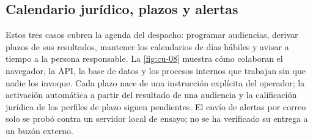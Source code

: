 
\newcommand{\CUcFicha}[2][7]{\par\medskip\Needspace{#1\baselineskip}\begingroup
  \captionof{table}{#2}}
\newcommand{\CUcFila}[3][]{\par\ifx b#1\nopagebreak[4]\fi\ifx p#1\nopagebreak[4]\fi
  \noindent
  \begin{tabularx}{\linewidth}{@{}>{\bfseries}L{2.65cm} X@{}}
    \ifx t#1\toprule\fi #2 & #3 \\ \ifx b#1\bottomrule\fi
  \end{tabularx}\par}
\newcommand{\CUcFin}{\endgroup\par\medskip}

\subsection{Calendario jurídico, plazos y alertas}\label{sec:cu-calendario}

Estos tres casos cubren la agenda del despacho: programar audiencias, derivar
plazos de sus resultados, mantener los calendarios de días hábiles y avisar a
tiempo a la persona responsable. La \cref{fig:cu-08} muestra cómo colaboran el
navegador, la API, la base de datos y los procesos internos que trabajan sin
que nadie los invoque. Cada plazo nace de una instrucción explícita del
operador; la activación automática a partir del resultado de una audiencia y
la calificación jurídica de los perfiles de plazo siguen pendientes. El envío
de alertas por correo solo se probó contra un servidor local de ensayo; no se
ha verificado su entrega a un buzón externo.

